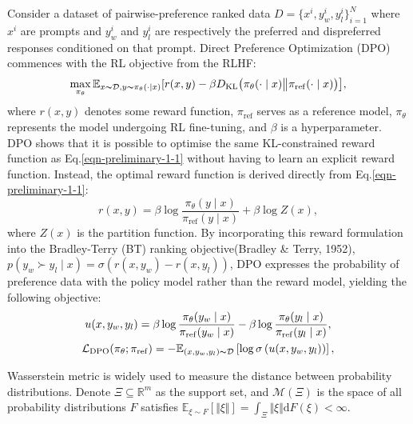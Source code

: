 % 




Consider a dataset of pairwise-preference ranked data $D = \{ x^i, y^i_w, y^i_l\}^N_{i=1}$ where $x^i$ are  prompts and $y^i_w$ and $y^i_l$ are respectively the preferred and dispreferred responses conditioned on that prompt. 
Direct Preference Optimization (DPO) commences with the RL objective from the RLHF:
\begin{equation}\label{eqn-preliminary-1-1}
    \max_{\pi_\theta}\mathbb{E}_{x\thicksim\mathcal{D},y\thicksim\pi_\theta(\cdot|x)}[r(x,y)-\beta D_{\mathrm{KL}}\big(\pi_\theta(\cdot\mid x)\big\Vert\pi_{\mathrm{ref}}(\cdot\mid x)\big)\big],
\end{equation}
where $r(x, y)$ denotes some reward function, $\pi_{\mathrm{ref}}$ serves as a reference model, $\pi_\theta$ represents the model undergoing RL fine-tuning, and $\beta$ is a hyperparameter. DPO shows that it is possible to optimise the same KL-constrained reward function as Eq.\ref{eqn-preliminary-1-1} without having to learn an explicit reward function. Instead, the optimal reward function is derived directly from Eq.\ref{eqn-preliminary-1-1}:
\begin{equation}
    \label{eqn-preliminary-1-2}
    r(x,y)=\beta\log\frac{\pi_\theta(y\mid x)}{\pi_{\mathrm{ref}}(y\mid x)}+\beta\log Z(x),
\end{equation}
where $Z(x)$ is the partition function. By incorporating this reward formulation into the Bradley-Terry (BT) ranking objective(Bradley \& Terry, 1952), $p(y_w \succ y_l \mid x) = \sigma (r(x, y_w) - r(x, y_l))$, DPO expresses the probability of preference data with the policy model rather than the reward model, yielding the following objective: 
\begin{equation}
    \label{eqn-preliminary-1-3}
\begin{gathered}
\begin{aligned}
u(x,y_w,y_l)=\beta\log\frac{\pi_\theta(y_w\mid x)}{\pi_{\mathrm{ref}}(y_w\mid x)}-\beta\log\frac{\pi_\theta(y_l\mid x)}{\pi_{\mathrm{ref}}(y_l\mid x)},
\end{aligned}\\\mathcal{L}_{\mathrm{DPO}}(\pi_{\theta};\pi_{\mathrm{ref}})=-\mathbb{E}_{(x,y_{w},y_{l})\thicksim\mathcal{D}}\left[\log\sigma\left(u(x,y_{w},y_{l})\right)\right],
\end{gathered}
\end{equation}



Wasserstein metric is widely used to measure the distance between probability distributions. Denote $\Xi \subseteq \mathbb{R}^m$ as the support set, and $\mathcal{M}(\Xi)$ is the space of all probability distributions $F$ satisfies $\mathbb{E}_{\xi \sim F} [\Vert\xi\Vert] = \int_{\Xi} \Vert \xi \Vert \mathrm{d} F(\xi) < \infty$.  

